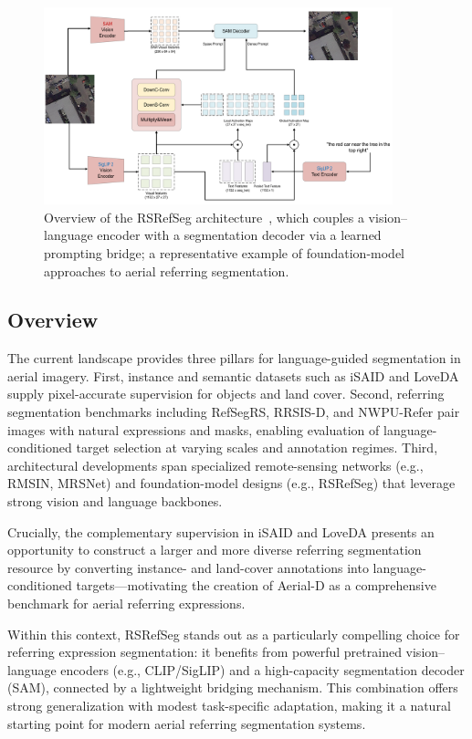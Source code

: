 \begin{figure}[t]
\centering
\includegraphics[width=0.9\textwidth]{./images/rsrefseg.png}
\caption{Overview of the RSRefSeg architecture~\cite{chen2025rsrefseg}, which couples a vision–language encoder with a segmentation decoder via a learned prompting bridge; a representative example of foundation-model approaches to aerial referring segmentation.}
\label{fig:rsrefseg_arch}
\end{figure}

\subsection{Overview}

The current landscape provides three pillars for language-guided segmentation in aerial imagery. First, instance and semantic datasets such as iSAID and LoveDA supply pixel-accurate supervision for objects and land cover. Second, referring segmentation benchmarks including RefSegRS, RRSIS-D, and NWPU-Refer pair images with natural expressions and masks, enabling evaluation of language-conditioned target selection at varying scales and annotation regimes. Third, architectural developments span specialized remote-sensing networks (e.g., RMSIN, MRSNet) and foundation-model designs (e.g., RSRefSeg) that leverage strong vision and language backbones.

Crucially, the complementary supervision in iSAID and LoveDA presents an opportunity to construct a larger and more diverse referring segmentation resource by converting instance- and land-cover annotations into language-conditioned targets—motivating the creation of Aerial-D as a comprehensive benchmark for aerial referring expressions.

Within this context, RSRefSeg stands out as a particularly compelling choice for referring expression segmentation: it benefits from powerful pretrained vision–language encoders (e.g., CLIP/SigLIP) and a high-capacity segmentation decoder (SAM), connected by a lightweight bridging mechanism. This combination offers strong generalization with modest task-specific adaptation, making it a natural starting point for modern aerial referring segmentation systems.
